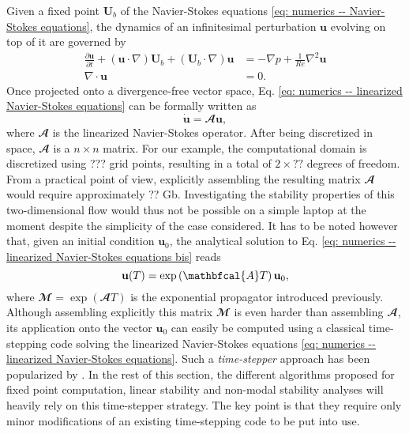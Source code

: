 Given a fixed point $\mathbf{U}_b$ of the Navier-Stokes equations \eqref{eq: numerics -- Navier-Stokes equations}, the dynamics of an infinitesimal perturbation $\mathbf{u}$ evolving on top of it are governed by
\begin{equation}
  \begin{aligned}
    \displaystyle \frac{\partial \mathbf{u}}{\partial t} + \left( \mathbf{u} \cdot \nabla \right) \mathbf{U}_b  + \left( \mathbf{U}_b \cdot \nabla \right) \mathbf{u} & = - \nabla p + \frac{1}{Re} \nabla^2 \mathbf{u} \\
    \nabla \cdot \mathbf{u} & = 0.
  \end{aligned}
  \label{eq: numerics -- linearized Navier-Stokes equations}
\end{equation}
Once projected onto a divergence-free vector space, Eq. \eqref{eq: numerics -- linearized Navier-Stokes equations} can be formally written as
\begin{equation}
  \dot{\mathbf{u}} = \mathbfcal{A}\mathbf{u},
  \label{eq: numerics -- linearized Navier-Stokes equations bis}
\end{equation}
where $\mathbfcal{A}$ is the linearized Navier-Stokes operator. After being discretized in space, $\mathbfcal{A}$ is a $n \times n$ matrix. For our example, the computational domain is discretized using ??? grid points, resulting in a total of $2 \times ??$ degrees of freedom. From a practical point of view, explicitly assembling the resulting matrix $\mathbfcal{A}$ would require approximately ?? Gb. Investigating the stability properties of this two-dimensional flow would thus not be possible on a simple laptop at the moment despite the simplicity of the case considered. It has to be noted however that, given an initial condition $\mathbf{u}_0$, the analytical solution to Eq. \eqref{eq: numerics -- linearized Navier-Stokes equations bis} reads
\begin{equation}
  \mathbf{u}(T) = \exp \left( \mathbfcal{A}T \right) \mathbf{u}_0,
  \notag
\end{equation}
where $\mathbfcal{M} = \exp \left( \mathbfcal{A}T \right)$ is the exponential propagator introduced previously. Although assembling explicitly this matrix $\mathbfcal{M}$ is even harder than assembling $\mathbfcal{A}$, its application onto the vector $\mathbf{u}_0$ can easily be computed using a classical time-stepping code solving the linearized Navier-Stokes equations \eqref{eq: numerics -- linearized Navier-Stokes equations}. Such a \emph{time-stepper} approach has been popularized by \cite{??}. In the rest of this section, the different algorithms proposed for fixed point computation, linear stability and non-modal stability analyses will heavily rely on this time-stepper strategy. The key point is that they require only minor modifications of an existing time-stepping code to be put into use.

